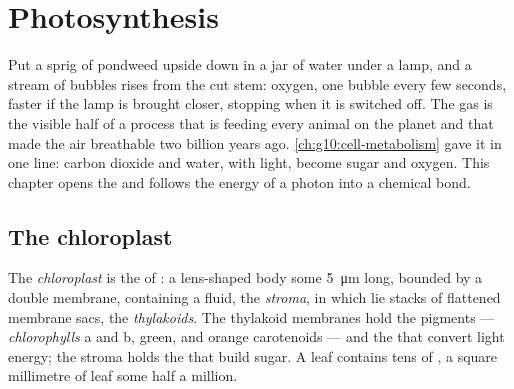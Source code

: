 \chapter{Photosynthesis}\label{ch:g12:photosynthesis}

Put a sprig of pondweed upside down in a jar of water under a lamp,
and a stream of bubbles rises from the cut stem: oxygen, one bubble
every few seconds, faster if the lamp is brought closer, stopping when
it is switched off. The gas is the visible half of a process that is
feeding every animal on the planet and that made the air breathable
two billion years ago. \cref{ch:g10:cell-metabolism} gave it in one
line: carbon dioxide and water, with light, become sugar and oxygen.
This chapter opens the  and follows the energy of a photon
into a chemical bond.

\section{The chloroplast}

\begin{definition}[Chloroplast]\label{def:g12:photosynthesis:chloroplast}
The \emph{chloroplast} is the  of
: a lens-shaped body some \qty{5}{\micro m} long, bounded
by a double membrane, containing a fluid, the \emph{stroma}, in which
lie stacks of flattened membrane sacs, the \emph{thylakoids}.
The thylakoid membranes hold the pigments --- \emph{chlorophylls} a
and b, green, and orange carotenoids --- and the  that convert
light energy; the stroma holds the  that build sugar. A leaf
 contains tens of , a square millimetre of leaf some
half a million.
\end{definition}

